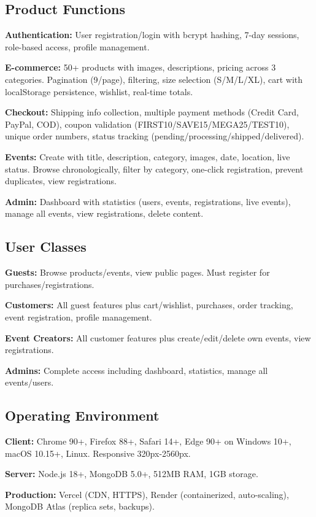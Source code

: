 ﻿\documentclass[11pt]{article}
\begin{document}
\subsection{Product Functions}
\textbf{Authentication:} User registration/login with bcrypt hashing, 7-day sessions, role-based access, profile management.

\textbf{E-commerce:} 50+ products with images, descriptions, pricing across 3 categories. Pagination (9/page), filtering, size selection (S/M/L/XL), cart with localStorage persistence, wishlist, real-time totals.

\textbf{Checkout:} Shipping info collection, multiple payment methods (Credit Card, PayPal, COD), coupon validation (FIRST10/SAVE15/MEGA25/TEST10), unique order numbers, status tracking (pending/processing/shipped/delivered).

\textbf{Events:} Create with title, description, category, images, date, location, live status. Browse chronologically, filter by category, one-click registration, prevent duplicates, view registrations.

\textbf{Admin:} Dashboard with statistics (users, events, registrations, live events), manage all events, view registrations, delete content.

\subsection{User Classes}
\textbf{Guests:} Browse products/events, view public pages. Must register for purchases/registrations.

\textbf{Customers:} All guest features plus cart/wishlist, purchases, order tracking, event registration, profile management.

\textbf{Event Creators:} All customer features plus create/edit/delete own events, view registrations.

\textbf{Admins:} Complete access including dashboard, statistics, manage all events/users.

\subsection{Operating Environment}
\textbf{Client:} Chrome 90+, Firefox 88+, Safari 14+, Edge 90+ on Windows 10+, macOS 10.15+, Linux. Responsive 320px-2560px.

\textbf{Server:} Node.js 18+, MongoDB 5.0+, 512MB RAM, 1GB storage.

\textbf{Production:} Vercel (CDN, HTTPS), Render (containerized, auto-scaling), MongoDB Atlas (replica sets, backups).
\end{document}

